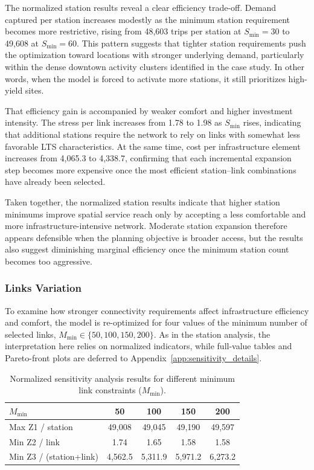 \documentclass[preprint,authoryear,10pt]{elsarticle}
\begin{document}
The normalized station results reveal a clear efficiency trade-off. Demand captured per station increases modestly as the minimum station requirement becomes more restrictive, rising from 48,603 trips per station at $S_{\min}=30$ to 49,608 at $S_{\min}=60$. This pattern suggests that tighter station requirements push the optimization toward locations with stronger underlying demand, particularly within the dense downtown activity clusters identified in the case study. In other words, when the model is forced to activate more stations, it still prioritizes high-yield sites.

That efficiency gain is accompanied by weaker comfort and higher investment intensity. The stress per link increases from 1.78 to 1.98 as $S_{\min}$ rises, indicating that additional stations require the network to rely on links with somewhat less favorable LTS characteristics. At the same time, cost per infrastructure element increases from 4,065.3 to 4,338.7, confirming that each incremental expansion step becomes more expensive once the most efficient station--link combinations have already been selected.

Taken together, the normalized station results indicate that higher station minimums improve spatial service reach only by accepting a less comfortable and more infrastructure-intensive network. Moderate station expansion therefore appears defensible when the planning objective is broader access, but the results also suggest diminishing marginal efficiency once the minimum station count becomes too aggressive.

\subsubsection{Links Variation}

To examine how stronger connectivity requirements affect infrastructure efficiency and comfort, the model is re-optimized for four values of the minimum number of selected links, $M_{\min}\in\{50,100,150,200\}$. As in the station analysis, the interpretation here relies on normalized indicators, while full-value tables and Pareto-front plots are deferred to Appendix~\ref{app:sensitivity_details}.

\begin{table}[htbp]
  \caption{Normalized sensitivity analysis results for different minimum link constraints ($M_{\min}$).}
  \label{tab:sensitivity_mmin_normalized}
  \centering
  \small
  \begin{tabular}{@{}lcccc@{}}
    \hline
    \textbf{$M_{\min}$} & \textbf{50} & \textbf{100} & \textbf{150} & \textbf{200} \\
    \hline
    Max Z1 / station & 49,008 & 49,045 & 49,190 & 49,597 \\
    Min Z2 / link    & 1.74   & 1.65   & 1.58   & 1.58  \\
    Min Z3 / (station+link) & 4,562.5 & 5,311.9 & 5,971.2 & 6,273.2 \\
    \hline
  \end{tabular}
\end{table}
\end{document}
